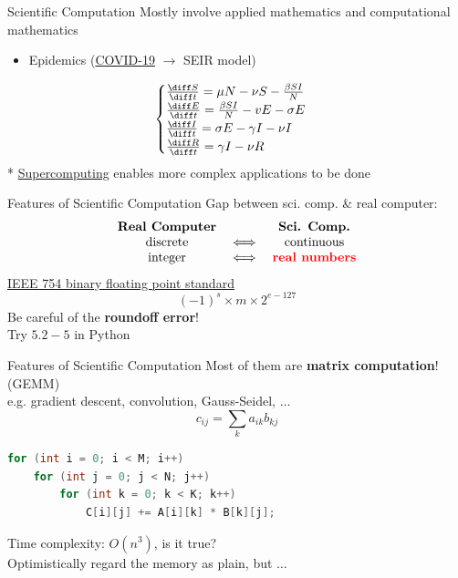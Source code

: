 \documentclass{../TexTemplate/myslide}
\begin{document}
\begin{frame}[fragile]{Scientific Computation}
Mostly involve applied mathematics and computational mathematics
\begin{itemize}
	\item Epidemics (\href{https://www.zhihu.com/question/367466399/answer/982597090}{COVID-19} $\to$ SEIR model)
\end{itemize}
\begin{center}
\small
{}
\end{center}
\[\begin{cases}
\frac{\diff S}{\diff t}=\mu N-\nu S-\frac{\beta SI}{N}\\
\frac{\diff E}{\diff t}=\frac{\beta S I}{N} - vE-\sigma E\\
\frac{\diff I}{\diff t}=\sigma E-\gamma I-\nu I\\
\frac{\diff R}{\diff t}=\gamma I-\nu R
\end{cases}\]
\pause
* \href{http://www.nscc-gz.cn/}{Supercomputing} enables more complex applications to be done
\end{frame}

\begin{frame}{Features of Scientific Computation}
Gap between sci. comp. \& real computer:
\[\begin{array}{ccc}
\textbf{Real Computer} &  & \textbf{Sci. Comp.}\\
\text{discrete} & \iff & \text{continuous}\\
\text{integer} & \iff & \textbf{\textcolor{red}{real numbers}}
\end{array}\]
\pause
\href{http://754r.ucbtest.org/standards/754xml.html}{IEEE 754 binary floating point standard}
\[(-1)^s\times m\times 2^{e-127}\]
Be careful of the \textbf{roundoff error}!\\
Try $5.2-5$ in Python
\end{frame}

\begin{frame}[fragile]{Features of Scientific Computation}
Most of them are \textbf{matrix computation}! (GEMM)\\
e.g. gradient descent, convolution, Gauss-Seidel, $\ldots$
\[c_{ij}=\sum_k a_{ik}b_{kj}\]
\begin{lstlisting}[language=c++]
for (int i = 0; i < M; i++)
    for (int j = 0; j < N; j++)
        for (int k = 0; k < K; k++)
            C[i][j] += A[i][k] * B[k][j];
\end{lstlisting}
\pause
Time complexity: $O(n^3)$, is it true?\\
\pause
Optimistically regard the memory as plain, but $\ldots$
\end{frame}
\end{document}
